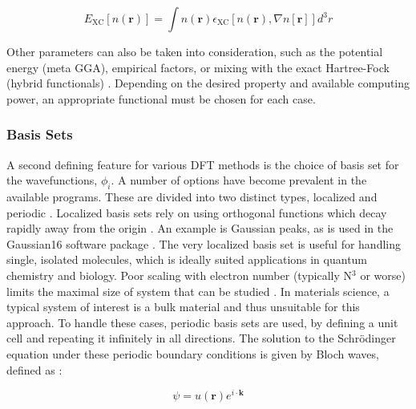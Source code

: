 \begin{equation}
E_{\mathrm{XC}}[n(\textbf{r})] = \int  n(\textbf{r}) \epsilon_{\mathrm{XC}}[n(\textbf{r}), \nabla n[\textbf{r}]] d^3r
\end{equation}


Other parameters can also be taken into consideration, such as the potential energy (meta GGA), empirical factors, or mixing with the exact Hartree-Fock (hybrid functionals) \cite{tao_climbing_2003, bj_pot}.  Depending on the desired property and available computing power, an appropriate functional must be chosen for each case.


\subsubsection{Basis Sets}
A second defining feature for various DFT methods is the choice of basis set for the wavefunctions, $\phi_i$.   A number of options have become prevalent in the available programs.  These are divided into two distinct types, localized and periodic \cite{sholl_density_2009}.  Localized basis sets rely on using orthogonal functions which decay rapidly away from the origin \cite{sholl_density_2009}.  An example is Gaussian peaks, as is used in the Gaussian16 software package \cite{g16}.  The very localized basis set is useful for handling single, isolated molecules, which is ideally suited applications in quantum chemistry and biology. Poor scaling with electron number (typically N$^3$ or worse) limits the maximal size of system that can be studied \cite{mohr_linear_2018}.  In materials science, a typical system of interest is a bulk material and thus unsuitable for this approach.  To handle these cases, periodic basis sets are used, by defining a unit cell and repeating it infinitely in all directions.  The solution to the Schr\"odinger equation under these periodic boundary conditions is given by Bloch waves, defined as \cite{griffiths}:

\begin{equation}
	\psi = u(\textbf{r}) e^{i\cdot \textbf{k}}
\end{equation}

